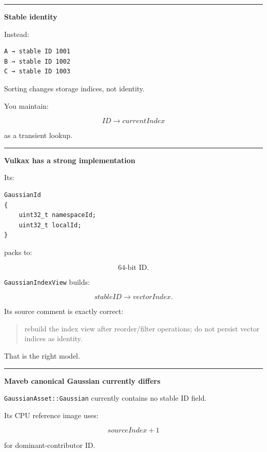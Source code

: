 \begin{center}\rule{0.5\linewidth}{0.5pt}\end{center}

\textbf{Stable identity}

Instead:

\protect{}\label{juc7yl}%
\begin{verbatim}
A → stable ID 1001
B → stable ID 1002
C → stable ID 1003
\end{verbatim}

Sorting changes storage indices, not identity.

You maintain:

\[
ID\rightarrow currentIndex
\]

as a transient lookup.

\begin{center}\rule{0.5\linewidth}{0.5pt}\end{center}

\textbf{Vulkax has a strong implementation}

Its:

\protect{}\label{t7ceps}%
\begin{verbatim}
GaussianId
{
    uint32_t namespaceId;
    uint32_t localId;
}
\end{verbatim}

packs to:

\[
64\text{-bit ID}.
\]

\texttt{GaussianIndexView} builds:

\[
stableID\rightarrow vectorIndex.
\]

Its source comment is exactly correct:

\begin{quote}
rebuild the index view after reorder/filter operations; do not persist vector indices as identity.
\end{quote}

That is the right model.

\begin{center}\rule{0.5\linewidth}{0.5pt}\end{center}

\textbf{Maveb canonical Gaussian currently differs}

\texttt{GaussianAsset::Gaussian} currently contains no stable ID field.

Its CPU reference image uses:

\[
sourceIndex+1
\]

for dominant-contributor ID.

